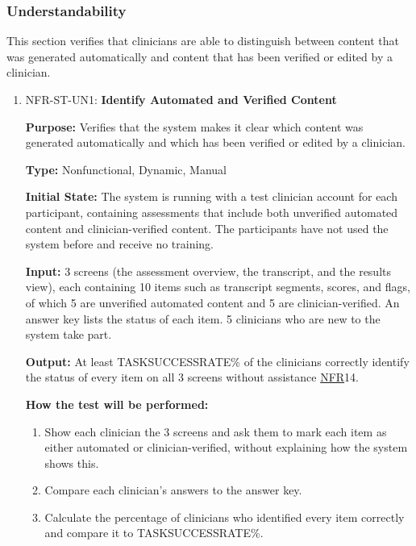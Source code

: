 \documentclass[12pt, titlepage]{article}
\newcommand{\srsnfr}[1]{\href{https://github.com/Nour-Fawaz/MacaBoca/blob/main/pdfs/SRS/SRS.pdf}{NFR}}
\renewcommand{\_}{\oldunderscore\allowbreak}
\begin{document}
\subsubsection{Understandability}
This section verifies that clinicians are able to distinguish between content that was generated automatically and content that has been verified or edited by a clinician.
\begin{enumerate}
  \item NFR-ST-UN1: \textbf{Identify Automated and Verified Content\\}
  \begin{mdframed}[linewidth=0.5mm]
      \textbf{Purpose:} Verifies that the system makes it clear which content was generated automatically and which has been verified or edited by a clinician. \par
      \textbf{Type:} Nonfunctional, Dynamic, Manual \par
      \textbf{Initial State:} The system is running with a test clinician account for each participant, containing assessments that include both unverified automated content and clinician-verified content. The participants have not used the system before and receive no training. \par
      \textbf{Input:} 3 screens (the assessment overview, the transcript, and the results view), each containing 10 items such as transcript segments, scores, and flags, of which 5 are unverified automated content and 5 are clinician-verified. An answer key lists the status of each item. 5 clinicians who are new to the system take part. \par
      \textbf{Output:} At least TASK\_SUCCESS\_RATE\% of the clinicians correctly identify the status of every item on all 3 screens without assistance \srsnfr*{14}. \par
      \textbf{How the test will be performed:}
      \begin{enumerate}
        \item[1.] Show each clinician the 3 screens and ask them to mark each item as either automated or clinician-verified, without explaining how the system shows this.
        \item[2.] Compare each clinician's answers to the answer key.
        \item[3.] Calculate the percentage of clinicians who identified every item correctly and compare it to TASK\_SUCCESS\_RATE\%.
      \end{enumerate}
  \end{mdframed}
\end{enumerate}
\end{document}
